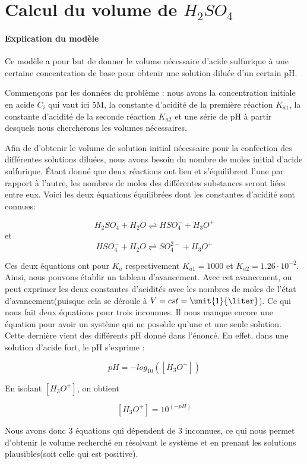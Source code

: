 \documentclass{article}
\begin{document}
\section{Calcul du volume de $H_{2}SO_{4}$}

\paragraph{Explication du modèle}

Ce modèle a pour but de donner le volume nécessaire d'acide sulfurique à une certaine concentration de base pour obtenir une solution diluée d'un certain pH.

Commençons par les données du problème : nous avons la concentration initiale en acide $C_{i}$ qui vaut ici \unit{5}{M}, la constante d'acidité de la première réaction $K_{a1}$, la constante d'acidité de la seconde réaction $K_{a2}$ et une série de pH à partir desquels nous chercherons les volumes nécessaires.

Afin de d'obtenir le volume de solution initial nécessaire pour la confection des différentes solutions diluées, nous avons besoin du nombre de moles initial d'acide sulfurique. Étant donné que deux réactions ont lieu et s'équilibrent l'une par rapport à l'autre, les nombres de moles des différentes substances seront liées entre eux. Voici les deux équations équilibrées dont les constantes d'acidité sont connues:

$$ H_{2}SO_{4} + H_{2}O \rightleftharpoons HSO_{4}^{-} + H_{3}O^{+} $$
et
$$ HSO_{4}^{-} + H_{2}O \rightleftharpoons SO_{4}^{2-} + H_{3}O^{+} $$

Ces deux équations ont pour $K_{a}$ respectivement $K_{a1} = 1000$ et $K_{a2} = 1.26\cdot 10^{-2}$. Ainsi, nous pouvons établir un tableau d'avancement. Avec cet avancement, on peut exprimer les deux constantes d'acidités avec les nombres de moles de l'état d'avancement(puisque cela se déroule à $V = cst = \unit{1}{\liter}$). Ce qui nous fait deux équations pour trois inconnues. Il nous manque encore une équation pour avoir un système qui ne possède qu'une et une seule solution. Cette dernière vient des différents pH donné dans l'énoncé. En effet, dans une solution d'acide fort, le pH s'exprime :

$$pH = -log_{10}([H_{3}O^{+}])$$

En isolant $[H_{3}O^{+}]$, on obtient

$$[H_{3}O^{+}] = 10^(-pH)$$

Nous avons donc $3$ équations qui dépendent de $3$ inconnues, ce qui nous permet d'obtenir le volume recherché en résolvant le système et en prenant les solutions plausibles(soit celle qui est positive).
\end{document}
